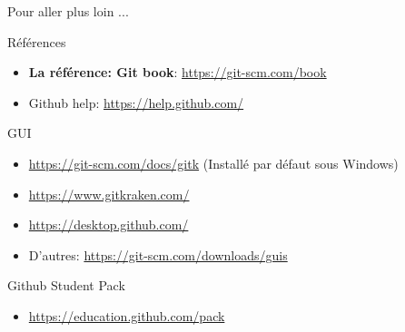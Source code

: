 \documentclass{beamer}
\begin{document}
\begin{frame}{Pour aller plus loin ...}

Références
\begin{itemize}
    \item \textbf{La référence: Git book}: \url{https://git-scm.com/book}
    \item Github help: \url{https://help.github.com/}
\end{itemize}

GUI
    \begin{itemize}
        \item \url{https://git-scm.com/docs/gitk} (Installé par défaut sous Windows)
      \item \url{https://www.gitkraken.com/}
      \item \url{https://desktop.github.com/}
      \item D'autres: \url{https://git-scm.com/downloads/guis}
    \end{itemize}
Github Student Pack
\begin{itemize}
    \item \url{https://education.github.com/pack}
\end{itemize}
\end{frame}

\end{document}
